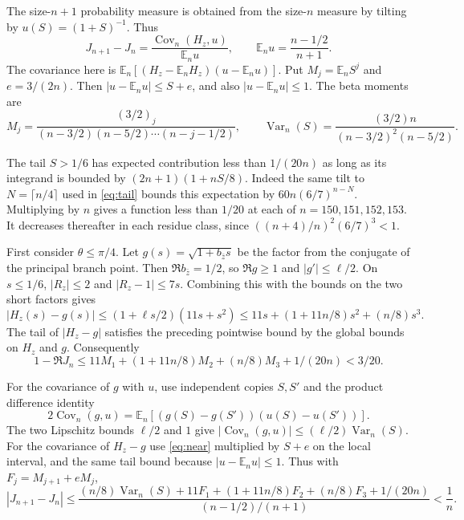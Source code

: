 \documentclass[11pt]{article}
\begin{document}
The size-$n+1$ probability measure is obtained from the size-$n$ measure by tilting by $u(S)=(1+S)^{-1}$. Thus
\begin{equation}
J_{n+1}-J_n=\frac{\operatorname{Cov}_n(H_z,u)}{\mathbb E_n u},\qquad
\mathbb E_n u=\frac{n-1/2}{n+1}.
\label{eq:covariance}
\end{equation}
The covariance here is $\mathbb E_n[(H_z-\mathbb E_n H_z)(u-\mathbb E_n u)]$. Put $M_j=\mathbb E_n S^j$ and $e=3/(2n)$. Then $|u-\mathbb E_n u|\le S+e$, and also $|u-\mathbb E_n u|\le1$. The beta moments are
\[
M_j=\frac{(3/2)_j}{(n-3/2)(n-5/2)\cdots(n-j-1/2)},\qquad
\operatorname{Var}_n(S)=\frac{(3/2)n}{(n-3/2)^2(n-5/2)}.
\]

The tail $S>1/6$ has expected contribution less than $1/(20n)$ as long as its integrand is bounded by $(2n+1)(1+nS/8)$. Indeed the same tilt to $N=\lceil n/4\rceil$ used in \eqref{eq:tail} bounds this expectation by $60n(6/7)^{n-N}$. Multiplying by $n$ gives a function less than $1/20$ at each of $n=150,151,152,153$. It decreases thereafter in each residue class, since $((n+4)/n)^2(6/7)^3<1$.

First consider $\theta\le\pi/4$. Let $g(s)=\sqrt{1+b_{\bar z}s}$ be the factor from the conjugate of the principal branch point. Then $\Re b_{\bar z}=1/2$, so $\Re g\ge1$ and $|g'|\le\ell/2$. On $s\le1/6$, $|R_z|\le2$ and $|R_z-1|\le7s$. Combining this with the bounds on the two short factors gives
\begin{equation}
|H_z(s)-g(s)|\le (1+\ell s/2)(11s+s^2)
\le 11s+(1+11n/8)s^2+(n/8)s^3.
\label{eq:near}
\end{equation}
The tail of $|H_z-g|$ satisfies the preceding pointwise bound by the global bounds on $H_z$ and $g$. Consequently
\begin{equation}
1-\Re J_n\le11M_1+(1+11n/8)M_2+(n/8)M_3+1/(20n)<3/20 .
\label{eq:amp}
\end{equation}

For the covariance of $g$ with $u$, use independent copies $S,S'$ and the product difference identity
\[
2\operatorname{Cov}_n(g,u)=\mathbb E_n[(g(S)-g(S'))(u(S)-u(S'))].
\]
The two Lipschitz bounds $\ell/2$ and $1$ give $|\operatorname{Cov}_n(g,u)|\le(\ell/2)\operatorname{Var}_n(S)$. For the covariance of $H_z-g$ use \eqref{eq:near} multiplied by $S+e$ on the local interval, and the same tail bound because $|u-\mathbb E_n u|\le1$. Thus with $F_j=M_{j+1}+eM_j$,
\begin{equation}
|J_{n+1}-J_n|
\le
\frac{(n/8)\operatorname{Var}_n(S)+11F_1+(1+11n/8)F_2+(n/8)F_3+1/(20n)}
     {(n-1/2)/(n+1)}
<\frac1n.
\label{eq:nearshift}
\end{equation}
\end{document}
